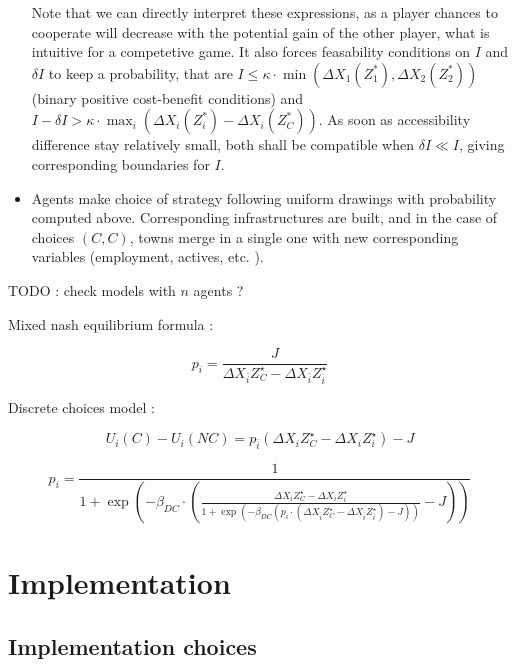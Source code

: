 \begin{itemize}
Note that we can directly interpret these expressions, as a player chances to cooperate will decrease with the potential gain of the other player, what is intuitive for a competetive game. It also forces feasability conditions on $I$ and $\delta I$ to keep a probability, that are $I \leq \kappa\cdot \min(\Delta X_1(Z^{\ast}_1),\Delta X_2(Z^{\ast}_2))$ (binary positive cost-benefit conditions) and $I-\delta I > \kappa \cdot \max_i (\Delta X_i(Z^{\ast}_i)-\Delta X_i(Z^{\ast}_C))$. As soon as accessibility difference stay relatively small, both shall be compatible when $\delta I \ll I$, giving corresponding boundaries for $I$.

\item Agents make choice of strategy following uniform drawings with probability computed above. Corresponding infrastructures are built, and in the case of choices $(C,C)$, towns merge in a single one with new corresponding variables (employment, actives, etc. ).


\end{itemize}











TODO : check models with $n$ agents ?

Mixed nash equilibrium formula : 

\[
p_i = \frac{J}{\Delta X_{\bar{i}}{Z^{\star}_{C}} - \Delta X_{\bar{i}}{Z^{\star}_{\bar{i}}}}
\]


Discrete choices model :

\[
U_i(C) - U_i(NC) = p_{\bar{i}} \left( \Delta X_{i}{Z^{\star}_{C}} - \Delta X_{i}{Z^{\star}_{i}}\right) - J
\]

\[
p_i = \frac{1}{1 + \exp{\left(-\beta_{DC}\cdot \left(\frac{\Delta X_{i}{Z^{\star}_{C}} - \Delta X_{i}{Z^{\star}_{i}}}{1 + \exp{\left(- \beta_{DC}(p_i \cdot (\Delta X_{\bar{i}}{Z^{\star}_{C}} - \Delta X_{\bar{i}}{Z^{\star}_{\bar{i}}}) - J)\right)}} - J \right)\right)}}
\]





\section{Implementation}



\subsection{Implementation choices}

